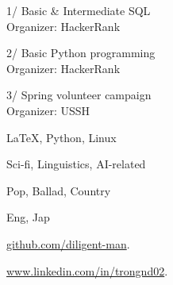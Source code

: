 \documentclass[11pt]{spidercv}
\begin{document}
\begin{SideBar}{\ColorBackground}{\ColorTextSide}
		
		\vspace{-0.5cm}
		\begin{ItemList}{\ColorHighlight}
			\item \hspace{-.5cm} 1/ Basic \& Intermediate SQL\\
			\hspace{-6.6mm} Organizer: HackerRank
			
			\item \hspace{-.5cm} 2/ Basic Python programming\\
			\hspace{-6.6mm} Organizer: HackerRank
			
			\item \hspace{-.5cm} 3/ Spring volunteer campaign\\
			\hspace{-6.6mm} Organizer: USSH
		\end{ItemList}
		
			
		\vspace{-0.5cm}
		\begin{ItemList}{\ColorHighlight}
			\item [\faCode] \LaTeX, Python, Linux
			\item [\faBook] Sci-fi, Linguistics, AI-related
			\item [\faMusic] Pop, Ballad, Country
			\item [\faLanguage] Eng, Jap
		\end{ItemList}
		
		
		
		\vspace{-0.5cm}
		\begin{ItemList}{\ColorHighlight}
			\item [\faGithub] \href{github.com/diligent-man}{github.com/diligent-man}.
			\item [\faLinkedinSquare] \href{www.linkedin.com/in/trongnd02}{www.linkedin.com/in/trongnd02}.
		\end{ItemList}
	
	\end{SideBar}
	
	
\end{document}

